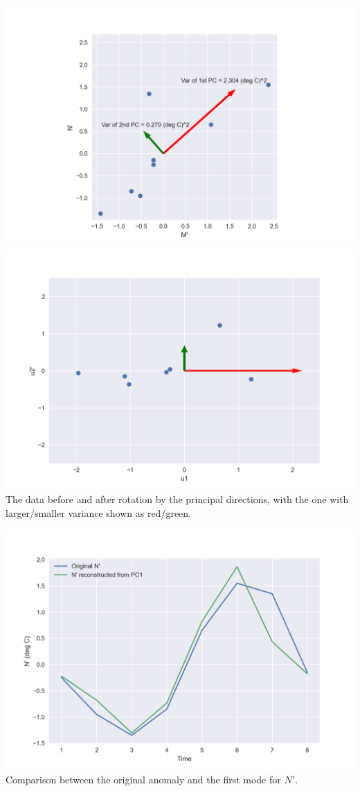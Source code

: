 \newpage
\begin{center}
\includegraphics[scale = 0.6]{LAEOF.png}\\
\includegraphics[scale = 0.6]{LAEOF2.png}\\
The data before and after rotation by the principal directions, with the one with larger/smaller variance shown as red/green.
\end{center}
\begin{center}
\includegraphics[scale = 0.6]{LAEOF3.png}\\
Comparison between the original anomaly and the first mode for $N'$.
\end{center}

